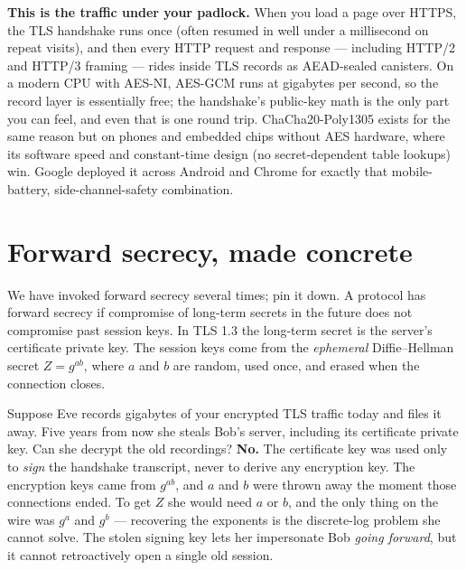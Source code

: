 \begin{applicationbox}
\textbf{This is the traffic under your padlock.} When you load a page over HTTPS,
the TLS handshake runs once (often resumed in well under a millisecond on repeat
visits), and then every HTTP request and response --- including HTTP/2 and HTTP/3
framing --- rides inside TLS records as AEAD-sealed canisters. On a modern CPU
with AES-NI, AES-GCM runs at gigabytes per second, so the record layer is
essentially free; the handshake's public-key math is the only part you can feel,
and even that is one round trip. ChaCha20-Poly1305 exists for the same reason but
on phones and embedded chips without AES hardware, where its software speed and
constant-time design (no secret-dependent table lookups) win. Google deployed it
across Android and Chrome for exactly that mobile-battery, side-channel-safety
combination.
\end{applicationbox}

\section{Forward secrecy, made concrete}

We have invoked forward secrecy several times; pin it down. A protocol has forward
secrecy if compromise of long-term secrets in the future does not compromise past
session keys. In TLS 1.3 the long-term secret is the server's certificate private
key. The session keys come from the \emph{ephemeral} Diffie--Hellman secret $Z =
g^{ab}$, where $a$ and $b$ are random, used once, and erased when the connection
closes.

\begin{intuitionbox}
Suppose Eve records gigabytes of your encrypted TLS traffic today and files it
away. Five years from now she steals Bob's server, including its certificate
private key. Can she decrypt the old recordings? \textbf{No.} The certificate key
was used only to \emph{sign} the handshake transcript, never to derive any
encryption key. The encryption keys came from $g^{ab}$, and $a$ and $b$ were thrown
away the moment those connections ended. To get $Z$ she would need $a$ or $b$, and
the only thing on the wire was $g^a$ and $g^b$ --- recovering the exponents is the
discrete-log problem she cannot solve. The stolen signing key lets her impersonate
Bob \emph{going forward}, but it cannot retroactively open a single old session.
\end{intuitionbox}

